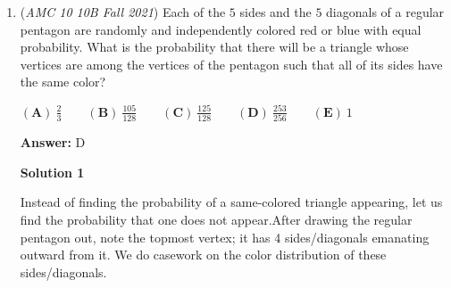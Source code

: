 \begin{enumerate}
\textbf{Solution 4}

Consider the product $(1+2+3+4+\dots +n)(1+2+3+4+\dots +n)$. We see that every possible pair of products are formed, along with perfect squares such as $1^2, 2^2, \dots$. Writing in summation notation, we find 
 \[(\sum_{i=1}^n i)^2 = \sum_{i=1}^n i^2 + 2 S_n\] Recall that the sum of the first $n$ positive integers is $\frac{n(n+1)}{2}$ and the sum of the first $n$ positive integers squared is $\frac{n(n+1)(2n+1)}{6}$. Thus, 
 \[\left(\frac{n(n+1)}{2}\right)^2 = \frac{n^2(n+1)^2}{4}\]. Factoring $\frac{n(n+1)}{2}$, we find 
 \[= \frac{n(n+1)}{2} \left[ \frac{n(n+1)}{2} - \frac{2n+1}{3} \right]\]. Then, finding a common denominator and simplifying yields 
 \[S_n = \frac{n(n-1)(n+1)(3n+2)}{24}\]. Note that this is 
 \[S_n = \left( \frac{n(n-1)(n+1)}{6} \right) \cdot \frac{3n+2}{4}\]. The $\frac{3n+2}{4}$ is irrelevant, as it can never produce a multiple of $3$. So, the only relevant part of the product is $\frac{n(n-1)(n+1)}{6}$. Note that we are at least guaranteed one $3$, but this could just cancel out and we wouldn't have a multiple of $3$ in total due to the denominator having a $3$. So, we need at least a multiple of $9$. Letting $n-1, n, n+1=9$, we find $n=8, 9, 10$. We repeat this with $18$ and so on, and finally to $36 = n+1 \implies n = 35$. Which is the tenth smallest value. So, we see $(8+9+10)+(17+18+19)+(26+27+28)+35=3(9+18+27)+35=162+35=197$, which corresponds to $\boxed{B}$.

 


	\item (\textit{AMC 10 10B Fall 2021}) Each of the $5{ }$ sides and the $5{ }$ diagonals of a regular pentagon are randomly and independently colored red or blue with equal probability. What is the probability that there will be a triangle whose vertices are among the vertices of the pentagon such that all of its sides have the same color?


 $(\textbf{A})\: \frac23\qquad(\textbf{B}) \: \frac{105}{128}\qquad(\textbf{C}) \: \frac{125}{128}\qquad(\textbf{D}) \: \frac{253}{256}\qquad(\textbf{E}) \: 1$

 \textbf{Answer: }D



\textbf{Solution 1}

Instead of finding the probability of a same-colored triangle appearing, let us find the probability that one does not appear.After drawing the regular pentagon out, note the topmost vertex; it has 4 sides/diagonals emanating outward from it. We do casework on the color distribution of these sides/diagonals.


\end{enumerate}
